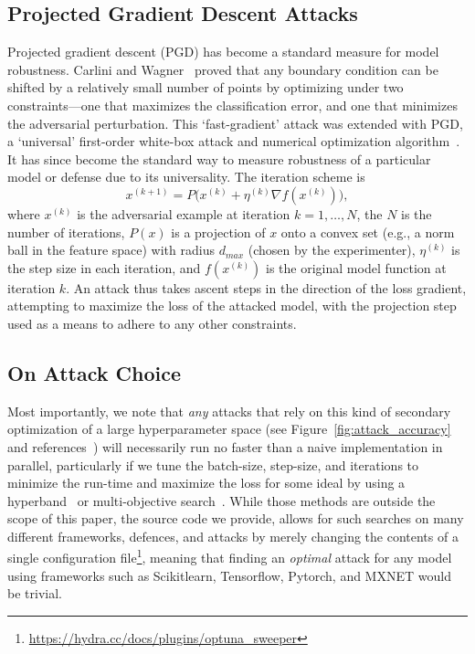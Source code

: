 \documentclass[fonts]{icst}
\begin{document}
\subsection{Projected Gradient Descent Attacks}

Projected gradient descent (PGD) has become a standard measure for model robustness. Carlini and Wagner~\cite{carlini2017towards} proved that any boundary condition can be shifted by a relatively small number of points by optimizing under two constraints---one that maximizes the classification error, and one that minimizes the adversarial perturbation. This `fast-gradient' attack was extended with PGD, a `universal' first-order white-box attack and numerical optimization algorithm~\cite{madry2017towards}. It has since become the standard way to measure robustness of a particular model or defense due to its universality. The iteration scheme is
$$
    x^{(k+1)} = P\big(x^{(k)} + \eta^{(k)} \nabla f(x^{(k)})\big),
$$
where $x^{(k)}$ is the adversarial example at iteration $k = 1,\ldots,N$, the $N$ is the number of iterations, $P(x)$ is a projection of $x$ onto a convex set (e.g., a norm ball in the feature space) with radius $d_{max}$ (chosen by the experimenter), $\eta^{(k)}$ is the step size in each iteration, and $f(x^{(k)})$ is the original model function at iteration $k$. An attack thus takes ascent steps in the direction of the loss gradient, attempting to maximize the loss of the attacked model, with the projection step used as a means to adhere to any other constraints.

\subsection{On Attack Choice}

Most importantly, we note that \textit{any} attacks that rely on this kind of secondary optimization of a large hyperparameter space (see Figure~\ref{fig:attack_accuracy} and references~\cite{su2019one,carlini2017towards,chen2020hopskipjumpattack,brown2017adversarial,brendel2017decision,croce2020reliable,liu2018dpatch,qin2019imperceptible,grosse2018limitations,kotyan2019adversarial,chen2017zoo}) will necessarily run no faster than a naive implementation in parallel, particularly if we tune the batch-size, step-size, and iterations to minimize the run-time and maximize the loss for some ideal by using a hyperband~\cite{li2017hyperband} or multi-objective search~\cite{hansen2016cma,ozaki2022multiobjective}. While those methods are outside the scope of this paper, the source code we provide, allows for such searches on many different frameworks, defences, and attacks by merely changing the contents of a single configuration file\footnote{\href{https://hydra.cc/docs/plugins/optuna_sweeper/}{https://hydra.cc/docs/plugins/optuna\_sweeper}}, meaning that finding an \textit{optimal} attack for any model using frameworks such as Scikitlearn, Tensorflow, Pytorch, and MXNET would be trivial.
\end{document}
